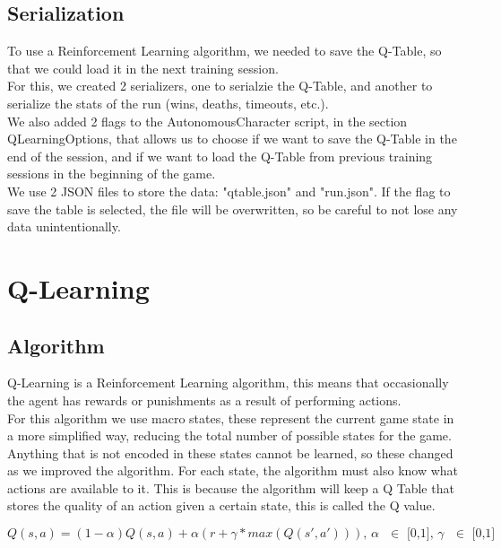 \documentclass{article}
\begin{document}
  \subsection{Serialization} 
  To use a Reinforcement Learning algorithm, we needed to save the Q-Table, so that we could load it in the next training session.\\
  For this, we created 2 serializers, one to serialzie the Q-Table, and another to serialize the stats of the run (wins, deaths, timeouts, etc.).\\
  We also added 2 flags to the AutonomousCharacter script, in the section QLearningOptions, that allows us to choose if we want to save the Q-Table 
  in the end of the session, and if we want to load the Q-Table from previous training sessions in the beginning of the game.\\
  We use 2 JSON files to store the data: "qtable.json" and "run.json". If the flag to save the table is selected, the file will be overwritten, 
  so be careful to not lose any data unintentionally.\\
  \section{Q-Learning}
  \subsection{Algorithm}
  Q-Learning is a Reinforcement Learning algorithm, this means that occasionally the agent has rewards or punishments as a result of
  performing actions.\\
  For this algorithm we use macro states, these represent the current game state in a more simplified way, reducing the total
  number of possible states for the game. Anything that is not encoded in these states cannot be learned, so these changed as
  we improved the algorithm. For each state, the algorithm must also know what actions are available to it. This is because the
  algorithm will keep a Q Table that stores the quality of an action given a certain state, this is called the Q value.

  \[Q(s,a) = (1-\alpha)Q(s, a) + \alpha(r + \gamma * max(Q(s', a'))) \text{, $\alpha$ $\in$ [0,1], $\gamma$ $\in$ [0,1]}\]
\end{document}
